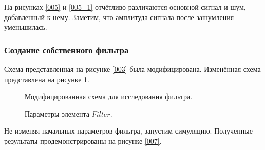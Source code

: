 \documentclass[a4paper,14pt]{extarticle}
\begin{document}
На рисунках \ref{005} и \ref{005_1} отчётливо различаются основной сигнал и шум, добавленный к нему. Заметим, что амплитуда сигнала после зашумления уменьшилась.

\subsubsection{Создание собственного фильтра}

Схема представленная на рисунке \ref{003} была модифицирована. Изменённая схема представлена на рисунке \ref{006}.

\begin{figure}[H]
\caption{Модифицированная схема для исследования фильтра.}
\label{006}
\end{figure}

\begin{figure}[H]
\caption{Параметры элемента $Filter$.}
\label{006_1}
\end{figure}

Не изменяя начальных параметров фильтра, запустим симуляцию. Полученные результаты продемонстрированы на рисунке \ref{007}.
\end{document}
